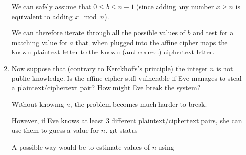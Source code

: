 \begin{problem}
\begin{enumerate}
\begin{Answer}
\noindent
We can safely assume that $0 \le b \le n-1$ 
(since adding any number $x \ge n$ is equivalent to adding
$x \mod n$).

\noindent
We can therefore iterate through all the possible values of $b$ and
test for a matching value for $a$ that, when plugged into the affine cipher
maps the known plaintext letter to the known (and correct) ciphertext letter.

\end{Answer}
\item Now suppose that (contrary to Kerckhoffs's principle) the integer $n$ is not public knowledge.
Is the affine cipher still vulnerable if Eve manages to steal a plaintext/ciphertext pair?
How might Eve break the system?
\begin{Answer}
  
Without knowing $n$, the problem becomes much harder to break.

\noindent
However, if Eve knows at least $3$ different plaintext/ciphertext pairs, she can use them to guess a value for $n$.
git status

\noindent
A possible way would be to estimate values of $n$ using 

\end{Answer}
\end{enumerate}
\end{problem}

